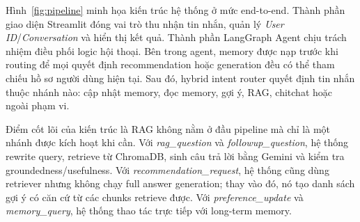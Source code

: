 \documentclass[11pt]{article}
\begin{document}
Hình~\ref{fig:pipeline} minh họa kiến trúc hệ thống ở mức end-to-end. Thành phần giao diện Streamlit đóng vai trò thu nhận tin nhắn, quản lý \textit{User ID}/\textit{Conversation} và hiển thị kết quả. Thành phần LangGraph Agent chịu trách nhiệm điều phối logic hội thoại. Bên trong agent, memory được nạp trước khi routing để mọi quyết định recommendation hoặc generation đều có thể tham chiếu hồ sơ người dùng hiện tại. Sau đó, hybrid intent router quyết định tin nhắn thuộc nhánh nào: cập nhật memory, đọc memory, gợi ý, RAG, chitchat hoặc ngoài phạm vi.

Điểm cốt lõi của kiến trúc là RAG không nằm ở đầu pipeline mà chỉ là một nhánh được kích hoạt khi cần. Với \textit{rag\_question} và \textit{followup\_question}, hệ thống rewrite query, retrieve từ ChromaDB, sinh câu trả lời bằng Gemini và kiểm tra groundedness/usefulness. Với \textit{recommendation\_request}, hệ thống cũng dùng retriever nhưng không chạy full answer generation; thay vào đó, nó tạo danh sách gợi ý có căn cứ từ các chunks retrieve được. Với \textit{preference\_update} và \textit{memory\_query}, hệ thống thao tác trực tiếp với long-term memory.
\end{document}
